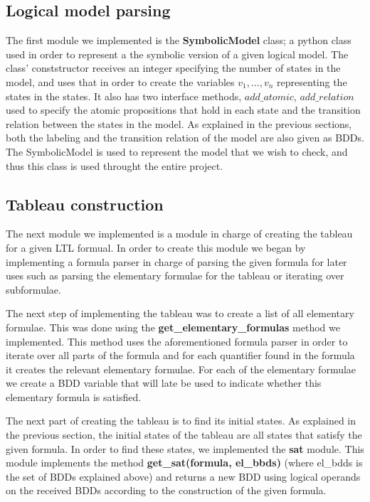 \documentclass[11pt]{article}
\begin{document}
    \subsection{Logical model parsing}
        The first module we implemented is the \textbf{SymbolicModel} class; 
        a python class used in order to represent a the symbolic version of 
        a given logical model.
        The class' conststructor receives an integer specifying the number of
        states in the model, and uses that in order to create the variables 
        $v_1, \dots, v_n$ representing the states in the states. It also
        has two interface methods, $add\_atomic$, $add\_relation$ used to
        specify the atomic propositions that hold in each state and the
        transition relation between the states in the model. As explained in
        the previous sections, both the labeling and the transition relation
        of the model are also given as BDDs.
        The SymbolicModel is used to represent the model that we wish to check,
        and thus this class is used throught the entire project.

    \subsection{Tableau construction}
        The next module we implemented is a module in charge of creating the
        tableau for a given LTL formual. In order to create this module we began
        by implementing a formula parser in charge of parsing the given formula 
        for later uses such as parsing the elementary formulae for the tableau or iterating
        over subformulae.

        The next step of implementing the tableau was to create a list of all
        elementary formulae. This was done using the \textbf{get\_elementary\_formulas}
        method we implemented. This method uses the aforementioned formula parser 
        in order to iterate over all parts of the formula and for each quantifier
        found in the formula it creates the relevant elementary formulae.
        For each of the elementary formulae we create a BDD variable that will
        late be used to indicate whether this elementary formula is satisfied.

        The next part of creating the tableau is to find its initial states. As
        explained in the previous section, the initial states of the tableau are
        all states that satisfy the given formula. In order to find these states,
        we implemented the \textbf{sat} module. This module implements the method
        \textbf{get\_sat(formula, el\_bbds)} (where el\_bdds is the set of BDDs
        explained above) and returns a new BDD using logical operands on the
        received BDDs according to the construction of the given formula.
\end{document}
